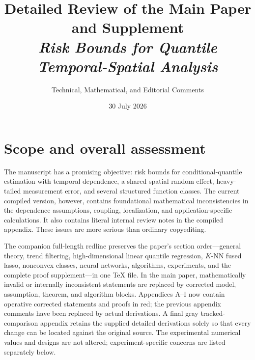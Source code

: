 \documentclass[11pt]{article}
\title{Detailed Review of the Main Paper and Supplement\\\textit{Risk Bounds for Quantile Temporal-Spatial Analysis}}
\author{Technical, Mathematical, and Editorial Comments}
\date{30 July 2026}
\begin{document}
\maketitle

\begin{center}
\end{center}

\section*{Scope and overall assessment}
The manuscript has a promising objective: risk bounds for conditional-quantile estimation with temporal dependence, a shared spatial random effect, heavy-tailed measurement error, and several structured function classes. The current compiled version, however, contains foundational mathematical inconsistencies in the dependence assumptions, coupling, localization, and application-specific calculations. It also contains literal internal review notes in the compiled appendix. These issues are more serious than ordinary copyediting.

The companion full-length redline preserves the paper's section order---general theory, trend filtering, high-dimensional linear quantile regression, $K$-NN fused lasso, nonconvex classes, neural networks, algorithms, experiments, and the complete proof supplement---in one TeX file. In the main paper, mathematically invalid or internally inconsistent statements are replaced by corrected model, assumption, theorem, and algorithm blocks. Appendices A--I now contain operative corrected statements and proofs in red; the previous appendix comments have been replaced by actual derivations. A final gray tracked-comparison appendix retains the supplied detailed derivations solely so that every change can be located against the original source. The experimental numerical values and designs are not altered; experiment-specific concerns are listed separately below.
\end{document}
